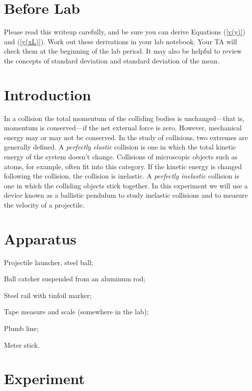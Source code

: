 \newexp

\section*{Before Lab}

Please read this writeup carefully, and be sure you can derive
Equations (\ref{v(y)}) and (\ref{y(xL)}).  Work out these
derivations in your lab notebook.  Your TA will check them at the
beginning of the lab period.  It may also be helpful to review the
concepts of standard deviation and standard deviation of the mean.

\section*{Introduction}

In a collision the total momentum of the colliding bodies is
unchanged---that is, momentum is conserved---if the net external force is
zero.  However,
mechanical energy may or may not be conserved.  In the study of
collisions, two extremes are generally
defined.  A {\em perfectly elastic} collision is one in which the
total kinetic energy of the system doesn't change.  Collisions of
microscopic objects such as atoms, for example, often fit into this
category.  If the kinetic energy is changed following the collision, 
the collision is inelastic.  A {\em perfectly
inelastic} collision is one in which the colliding objects stick
together.  In this experiment we will use a device known as a
ballistic pendulum to study inelastic collisions and to measure the
velocity of a projectile.


\section*{Apparatus}
\be
\item Projectile launcher, steel ball;
\item Ball catcher suspended from an aluminum rod;
\item Steel rail with tinfoil marker;
\item Tape measure and scale (somewhere in the lab);
\item Plumb line;
\item Meter stick.
\ee
\section*{Experiment}

